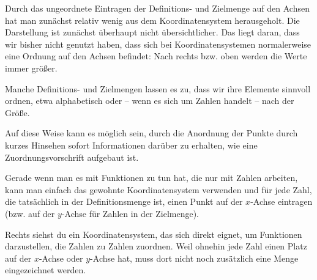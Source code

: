 \documentclass[../../main.tex]{subfiles}
\begin{document}
Durch das ungeordnete Eintragen der Definitions- und Zielmenge auf den Achsen hat man zunächst relativ wenig aus dem Koordinatensystem herausgeholt. Die Darstellung ist zunächst überhaupt nicht übersichtlicher. Das liegt daran, dass wir bisher nicht genutzt haben, dass sich bei Koordinatensystemen normalerweise eine Ordnung auf den Achsen befindet: Nach rechts bzw. oben werden die Werte immer größer.

Manche Definitions- und Zielmengen lassen es zu, dass wir ihre Elemente sinnvoll ordnen, etwa alphabetisch oder -- wenn es sich um Zahlen handelt -- nach der Größe.

Auf diese Weise kann es möglich sein, durch die Anordnung der Punkte durch kurzes Hinsehen sofort Informationen darüber zu erhalten, wie eine Zuordnungsvorschrift aufgebaut ist. 


Gerade wenn man es mit Funktionen zu tun hat, die nur mit Zahlen arbeiten, kann man einfach das gewohnte Koordinatensystem verwenden und für jede Zahl, die tatsächlich in der Definitionsmenge ist, einen Punkt auf der $x$-Achse eintragen (bzw. auf der $y$-Achse für Zahlen in der Zielmenge).

Rechts siehst du ein Koordinatensystem, das sich direkt eignet, um Funktionen darzustellen, die Zahlen zu Zahlen zuordnen. Weil ohnehin jede Zahl einen Platz auf der $x$-Achse oder $y$-Achse hat, muss dort nicht noch zusätzlich eine Menge eingezeichnet werden.
\end{document}
